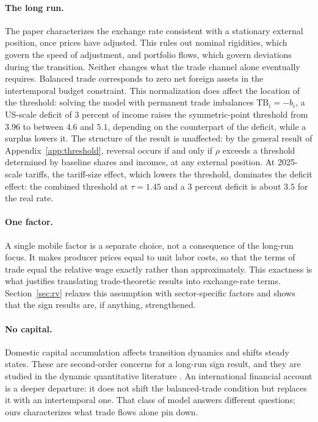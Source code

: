 \documentclass[11pt]{article}
\theoremstyle{plain}
\theoremstyle{remark}
\numberwithin{lemma}{section}
\numberwithin{proposition}{section}
\numberwithin{corollary}{section}
\newenvironment{revblock}{\par\begingroup\color{RevBlue}}{\endgroup\par}
\begin{document}
\begin{revblock}
\paragraph{The long run.} The paper characterizes the exchange rate consistent with a stationary external position, once prices have adjusted. This rules out nominal rigidities, which govern the speed of adjustment, and portfolio flows, which govern deviations during the transition. Neither changes what the trade channel alone eventually requires. Balanced trade corresponds to zero net foreign assets in the intertemporal budget constraint. This normalization does affect the location of the threshold: solving the model with permanent trade imbalances $\mathrm{TB}_i = -b_i$, a US-scale deficit of $3$ percent of income raises the symmetric-point threshold from $3.96$ to between $4.6$ and $5.1$, depending on the counterpart of the deficit, while a surplus lowers it. The structure of the result is unaffected: by the general result of Appendix~\ref{app:threshold}, reversal occurs if and only if $\rho$ exceeds a threshold determined by baseline shares and incomes, at any external position. At 2025-scale tariffs, the tariff-size effect, which lowers the threshold, dominates the deficit effect: the combined threshold at $\tau = 1.45$ and a $3$ percent deficit is about $3.5$ for the real rate.

\paragraph{One factor.} A single mobile factor is a separate choice, not a consequence of the long-run focus. It makes producer prices equal to unit labor costs, so that the terms of trade equal the relative wage exactly rather than approximately. This exactness is what justifies translating trade-theoretic results into exchange-rate terms. Section~\ref{sec:rv} relaxes this assumption with sector-specific factors and shows that the sign results are, if anything, strengthened.

\paragraph{No capital.} Domestic capital accumulation affects transition dynamics and shifts steady states. These are second-order concerns for a long-run sign result, and they are studied in the dynamic quantitative literature \citep{eaton2016, caliendo2019}. An international financial account is a deeper departure: it does not shift the balanced-trade condition but replaces it with an intertemporal one. That class of model answers different questions; ours characterizes what trade flows alone pin down.


\end{revblock}
\end{document}
